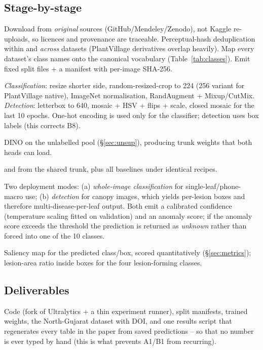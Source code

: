 \subsection{Stage-by-stage}
\begin{description}[style=nextline]
  \item[S1 -- Curation.] Download from \emph{original} sources (GitHub/Mendeley/Zenodo), not Kaggle re-uploads, so licences and provenance are traceable. Perceptual-hash deduplication within and \emph{across} datasets (PlantVillage derivatives overlap heavily). Map every dataset's class names onto the canonical vocabulary (Table~\ref{tab:classes}). Emit fixed split files + a manifest with per-image SHA-256.
  \item[S2 -- Task-specific pre-processing.] \emph{Classification}: resize shorter side, random-resized-crop to 224 (256 variant for PlantVillage native), ImageNet normalisation, RandAugment + Mixup/CutMix. \emph{Detection}: letterbox to 640, mosaic + HSV + flips + scale, closed mosaic for the last 10 epochs. One-hot encoding is used only for the classifier; detection uses box labels (this corrects B8).
  \item[S3 -- Pre-training.] DINO on the unlabelled pool (\S\ref{sec:unsup}), producing trunk weights that both heads can load.
  \item[S4 -- Supervised training.] \modelcls{} and \modeldet{} from the shared trunk, plus all baselines under identical recipes.
  \item[S5 -- Inference.] Two deployment modes: (a) \emph{whole-image classification} for single-leaf/phone-macro use; (b) \emph{detection} for canopy images, which yields per-lesion boxes and therefore multi-disease-per-leaf output. Both emit a calibrated confidence (temperature scaling fitted on validation) and an anomaly score; if the anomaly score exceeds the threshold the prediction is returned as \emph{unknown} rather than forced into one of the 10 classes.
  \item[S6 -- Explanation and severity.] Saliency map for the predicted class/box, scored quantitatively (\S\ref{sec:metrics}); lesion-area ratio inside boxes for the four lesion-forming classes.
\end{description}

\subsection{Deliverables}
Code (fork of Ultralytics + a thin experiment runner), split manifests, trained weights, the North-Gujarat dataset with DOI, and one results script that regenerates every table in the paper from saved predictions -- so that no number is ever typed by hand (this is what prevents A1/B1 from recurring).
